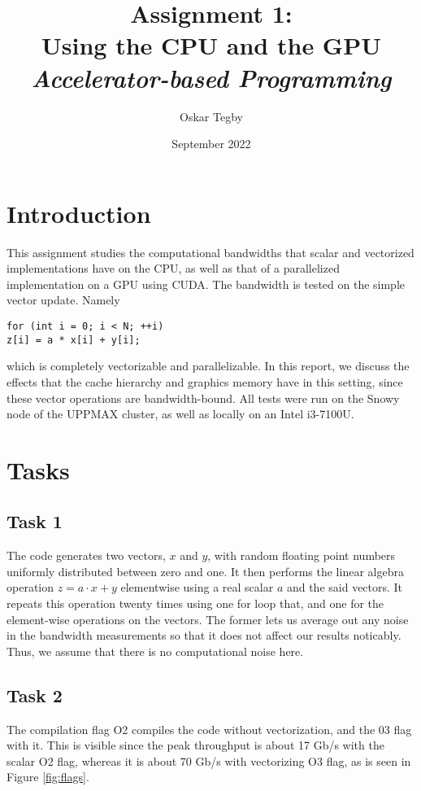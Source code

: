 \documentclass[10pt]{article}
\title{Assignment 1: \\ Using the CPU and the GPU \\ \large \textit{Accelerator-based Programming}}
\author{Oskar Tegby}
\date{September 2022}
\begin{document}
\maketitle


\section{Introduction}
This assignment studies the computational bandwidths that scalar and vectorized implementations have on the CPU, as well as that of a parallelized implementation on a GPU using CUDA. The bandwidth is tested on the simple vector update. Namely
\begin{center}
    \texttt{for (int i = 0; i < N; ++i)} \\
    \quad\texttt{z[i] = a * x[i] + y[i];}
\end{center}
which is completely vectorizable and parallelizable. In this report, we discuss the effects that the cache hierarchy and graphics memory have in this setting, since these vector operations are bandwidth-bound. All tests were run on the Snowy node of the UPPMAX cluster, as well as locally on an Intel i3-7100U.
\section{Tasks}
\subsection{Task 1}
The code generates two vectors, $x$ and $y$, with random floating point numbers uniformly distributed between zero and one. It then performs the linear algebra operation $z=a\cdot x+y$ elementwise using a real scalar $a$ and the said vectors. It repeats this operation twenty times using one for loop that, and one for the element-wise operations on the vectors. The former lets us average out any noise in the bandwidth measurements so that it does not affect our results noticably. Thus, we assume that there is no computational noise here.
\subsection{Task 2}
The compilation flag O2 compiles the code without vectorization, and the 03 flag with it. This is visible since the peak throughput is about 17 Gb/s with the scalar O2 flag, whereas it is about 70 Gb/s with vectorizing O3 flag, as is seen in Figure \ref{fig:flags}. \\
\end{document}
